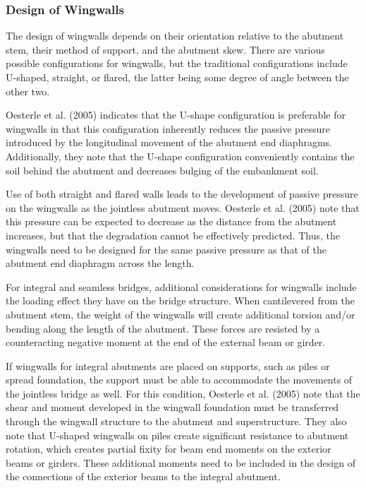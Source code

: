 \subsubsection{Design of Wingwalls}
The design of wingwalls depends on their orientation relative to the abutment stem, their method of support, and the abutment skew. There are various possible configurations for wingwalls, but the traditional configurations include U-shaped, straight, or flared, the latter being some degree of angle between the other two.

Oesterle et al. (2005) indicates that the U-shape configuration is preferable for wingwalls in that this configuration inherently reduces the passive pressure introduced by the longitudinal movement of the abutment end diaphragms. Additionally, they note that the U-shape configuration conveniently contains the soil behind the abutment and decreases bulging of the embankment soil.

Use of both straight and flared walls leads to the development of passive pressure on the wingwalls as the jointless abutment moves. Oesterle et al. (2005) note that this pressure can be expected to decrease as the distance from the abutment increases, but that the degradation cannot be effectively predicted. Thus, the wingwalls need to be designed for the same passive pressure as that of the abutment end diaphragm across the length.

For integral and seamless bridges, additional considerations for wingwalls include the loading effect they have on the bridge structure. When cantilevered from the abutment stem, the weight of the wingwalls will create additional torsion and/or bending along the length of the abutment. These forces are resisted by a counteracting negative moment at the end of the external beam or girder.

If wingwalls for integral abutments are placed on supports, such as piles or spread foundation, the support must be able to accommodate the movements of the jointless bridge as well. For this condition, Oesterle et al. (2005) note that the shear and moment developed in the wingwall foundation must be transferred through the wingwall structure to the abutment and superstructure. They also note that U-shaped wingwalls on piles create significant resistance to abutment rotation, which creates partial fixity for beam end moments on the exterior beams or girders. These additional moments need to be included in the design of the connections of the exterior beams to the integral abutment.

